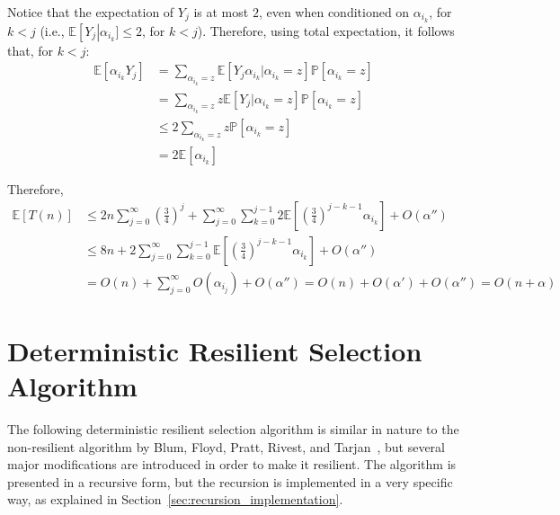 \documentclass{llncs}
\begin{document}
\begin{pf}
Notice that the expectation of $Y_j$ is at most $2$, even when conditioned on $\alpha_{i_k}$, for $k < j$ (i.e., $\mathbb{E}\left[ Y_j \right | \alpha_{i_k}] \leq 2$, for $k < j$). Therefore, using total expectation, it follows that, for $k < j$:
\begin{align*}
\mathbb{E}\left[\alpha_{i_k} Y_j \right] &= \sum_{\alpha_{i_k} = z} \mathbb{E}\left[Y_j \alpha_{i_k} | \alpha_{i_k} = z\right] \mathbb{P}\left[\alpha_{i_k} = z\right]\\
&= \sum_{\alpha_{i_k} = z} z \mathbb{E}\left[Y_j | \alpha_{i_k} = z\right] \mathbb{P}\left[\alpha_{i_k} = z\right]\\
&\leq 2 \sum_{\alpha_{i_k} = z} z \mathbb{P}\left[\alpha_{i_k} = z\right]\\
&= 2 \mathbb{E}\left[\alpha_{i_k}\right]
\end{align*}

Therefore,
\begin{align*}
\mathbb{E}\left[T(n)\right] &\leq 2 n \sum_{j=0}^{\infty} \left( \frac{3}{4} \right)^j + \sum_{j=0}^{\infty} \sum_{k=0}^{j - 1} 2 \mathbb{E} \left[ \left( \frac{3}{4} \right)^{j-k-1} \alpha_{i_k} \right] + O(\alpha'')\\
&\leq 8 n + 2 \sum_{j=0}^{\infty} \sum_{k=0}^{j - 1} \mathbb{E} \left[ \left( \frac{3}{4} \right)^{j-k-1} \alpha_{i_k} \right] + O(\alpha'')\\
&= O(n) + \sum_{j=0}^\infty O(\alpha_{i_j}) + O(\alpha'') = O(n) + O(\alpha') + O(\alpha'') = O(n + \alpha)
\end{align*}
\end{pf}





















\section{Deterministic Resilient Selection Algorithm}
\label{sec:resilient_deterministic_selection_algorithm}

The following deterministic resilient selection algorithm is similar in nature to the non-resilient algorithm by Blum, Floyd, Pratt, Rivest, and Tarjan~\cite{median_of_medians_algorithm}, but several major modifications are introduced in order to make it resilient. The algorithm is presented in a recursive form, but the recursion is implemented in a very specific way, as explained in Section~\ref{sec:recursion_implementation}.
\end{document}
